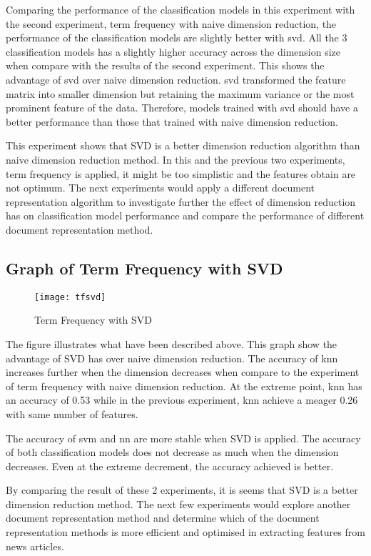 Comparing the performance of the classification models in this experiment with the second experiment, term frequency with naive dimension reduction, the performance of the classification models are slightly better with \ac{svd}. All the 3 classification models has a slightly higher accuracy across the dimension size when compare with the results of the second experiment. This shows the advantage of \ac{svd} over naive dimension reduction. \Ac{svd} transformed the feature matrix into smaller dimension but retaining the maximum variance or the most prominent feature of the data. Therefore, models trained with \ac{svd} should have a better performance than those that trained with naive dimension reduction.

This experiment shows that SVD is a better dimension reduction algorithm than naive dimension reduction method. In this and the previous two experiments, term frequency is applied, it might be too simplistic and the features obtain are not optimum. The next experiments would apply a different document representation algorithm to investigate further the effect of dimension reduction has on classification model performance and compare the performance of different document representation method.\\

\subsection{Graph of Term Frequency with SVD}
\begin{figure} [H]
	\centering
	\texttt{[image: tfsvd]}
	\caption{Term Frequency with SVD}
	\label{fig:tfsvd}
\end{figure}

The figure illustrates what have been described above. This graph show the advantage of SVD has over naive dimension reduction. The accuracy of \ac{knn} increases further when the dimension decreases when compare to the experiment of term frequency with naive dimension reduction. At the extreme point, \ac{knn} has an accuracy of 0.53 while in the previous experiment, \ac{knn} achieve a meager 0.26 with same number of features.

The accuracy of \ac{svm} and \ac{nn} are more stable when SVD is applied. The accuracy of both classification models does not decrease as much when the dimension decreases. Even at the extreme decrement, the accuracy achieved is better.

By comparing the result of these 2 experiments, it is seems that SVD is a better dimension reduction method. The next few experiments would explore another document representation method and determine which of the document representation methods is more efficient and optimised in extracting features from news articles.\\

